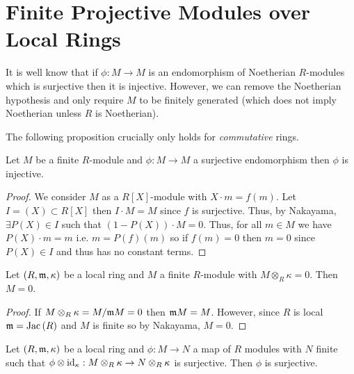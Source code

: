 \documentclass[12pt]{article}
\begin{document}
\section{Finite Projective Modules over Local Rings}

\begin{remark}
It is well know that if $\phi : M \to M$ is an endomorphism of Noetherian $R$-modules which is surjective then it is injective. However, we can remove the Noetherian hypothesis and only require $M$ to be finitely generated (which does not imply Noetherian unless $R$ is Noetherian). 
\end{remark}

\begin{remark}
The following proposition crucially only holds for \textit{commutative} rings.  
\end{remark}

\begin{theorem}
Let $M$ be a finite $R$-module and $\phi : M \to M$ a surjective endomorphism then $\phi$ is injective.
\end{theorem}

\begin{proof}
We consider $M$ as a $R[X]$-module with $X \cdot m  = f(m)$. Let $I = (X) \subset R[X]$ then $I \cdot M = M$ since $f$ is surjective. Thus, by Nakayama, $\exists P(X) \in I$ such that $(1 - P(X)) \cdot M = 0$. Thus, for all $m \in M$ we have $P(X) \cdot m = m$ i.e. $m = P(f)(m)$ so if $f(m) = 0$ then $m = 0$ since $P(X) \in I$ and thus has no constant terms.
\end{proof}

\begin{lemma}
Let $(R, \mathfrak{m}, \kappa)$ be a local ring and $M$ a finite $R$-module with $M \otimes_R \kappa = 0$. Then $M = 0$.
\end{lemma}

\begin{proof}
If $M \otimes_R \kappa = M / \mathfrak{m} M = 0$ then $\mathfrak{m} M = M$. However, since $R$ is local $\mathfrak{m} = \mathrm{Jac}\left( R \right)$ and $M$ is finite so by Nakayama, $M = 0$.
\end{proof}

\begin{lemma}
Let $(R, \mathfrak{m}, \kappa)$ be a local ring and $\phi : M \to N$ a map of $R$ modules with $N$ finite such that $\phi \otimes \mathrm{id}_\kappa : M \otimes_R \kappa \to N \otimes_R \kappa$ is surjective. Then $\phi$ is surjective.
\end{lemma}
\end{document}
